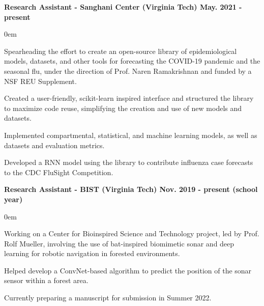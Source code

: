 \documentclass{article}
\begin{document}
\begin{center}
\begin{flushleft}
    \textbf{Research Assistant - Sanghani Center (Virginia Tech) \hfill May. 2021 - present}
    \begin{compactitem}
      \itemsep0em
      \item Spearheading the effort to create an open-source library of epidemiological models, datasets, and other tools for forecasting the COVID-19 pandemic and the seasonal flu, under the direction of Prof. Naren Ramakrishnan and funded by a NSF REU Supplement.
      \item Created a user-friendly, scikit-learn inspired interface and structured the library to maximize code reuse, simplifying the creation and use of new models and datasets.
      \item Implemented compartmental, statistical, and machine learning models, as well as datasets and evaluation metrics.
      \item Developed a RNN model using the library to contribute influenza case forecasts to the CDC FluSight Competition.
    \end{compactitem}

    \textbf{Research Assistant - BIST (Virginia Tech) \hfill Nov. 2019 - present (school year)}
    \begin{compactitem}
      \itemsep0em
      \item Working on a Center for Bioinspired Science and Technology project, led by Prof. Rolf Mueller, involving the use of bat-inspired biomimetic sonar and deep learning for robotic navigation in forested environments.
      \item Helped develop a ConvNet-based algorithm to predict the position of the sonar sensor within a forest area.
      \item Currently preparing a manuscript for submission in Summer 2022.
    \end{compactitem}


\end{flushleft}
\end{center}
\end{document}

